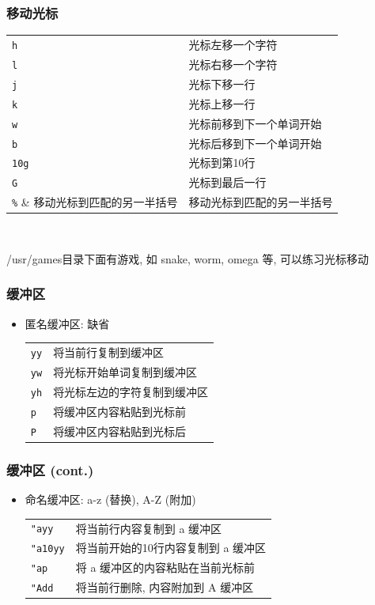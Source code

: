 \documentclass[compress]{beamer}
\begin{document}
\begin{frame}[fragile]
\frametitle{移动光标}

{\footnotesize
    \begin{tabular}{l@{\hspace{1cm}}l} \hline
    \verb~h~ & 光标左移一个字符 \\
    \verb~l~ & 光标右移一个字符 \\
    \verb~j~ & 光标下移一行 \\
    \verb~k~ & 光标上移一行 \\
    \verb~w~ & 光标前移到下一个单词开始 \\
    \verb~b~ & 光标后移到下一个单词开始 \\
    \verb~10g~ & 光标到第10行 \\
    \verb~G~ & 光标到最后一行 \\
    \verb~%~ & 移动光标到匹配的另一半括号 \\ \hline
    \end{tabular}\\[2ex]
	}

/usr/games目录下面有游戏, 如 snake, worm, omega 等, 可以练习光标移动
\end{frame}

\begin{frame}[fragile]
\frametitle{缓冲区}

\begin{itemize}
\item 匿名缓冲区: 缺省 \\[1ex]
    \begin{tabular}{l p{8cm}} \hline
    \verb~yy~ & 将当前行复制到缓冲区 \\
    \verb~yw~ & 将光标开始单词复制到缓冲区 \\
    \verb~yh~ & 将光标左边的字符复制到缓冲区 \\
    \verb~p~ & 将缓冲区内容粘贴到光标前 \\
    \verb~P~ & 将缓冲区内容粘贴到光标后 \\ \hline
    \end{tabular}
\end{itemize}

\end{frame}

\begin{frame}[fragile]
\frametitle{缓冲区 (cont.)}
\begin{itemize}
\item 命名缓冲区: a-z (替换), A-Z (附加)\\[1ex]
    \begin{tabular}{l p{8cm}} \hline
    \verb~"ayy~ & 将当前行内容复制到 a 缓冲区 \\
    \verb~"a10yy~ & 将当前开始的10行内容复制到 a 缓冲区 \\
    \verb~"ap~ & 将 a 缓冲区的内容粘贴在当前光标前 \\
    \verb~"Add~ & 将当前行删除, 内容附加到 A 缓冲区 \\ \hline
    \end{tabular}
\end{itemize}

\end{frame}
\end{document}
